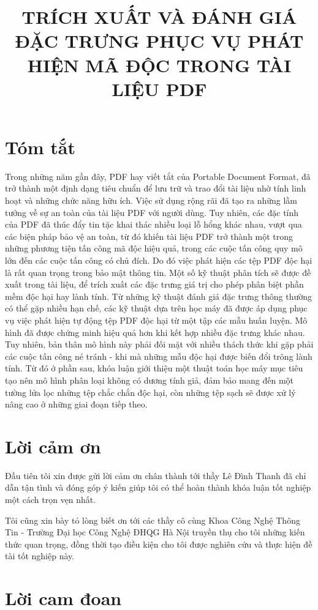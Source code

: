 \documentclass[12pt,a4paper]{report}
\title{TRÍCH XUẤT VÀ ĐÁNH GIÁ ĐẶC TRƯNG PHỤC VỤ PHÁT HIỆN MÃ ĐỘC TRONG TÀI LIỆU PDF}
\begin{document}

\clearpage{}

\chapter*{Tóm tắt}

Trong những năm gần đây, PDF hay viết tắt của Portable Document Format, đã trở thành một định dạng tiêu chuẩn để lưu trữ và trao đổi tài liệu nhờ tính linh hoạt và những chức năng hữu ích. Việc sử dụng rộng rãi đã tạo ra những lầm tưởng về sự an toàn của tài liệu PDF với người dùng. Tuy nhiên, các đặc tính của PDF đã thúc đẩy tin tặc khai thác nhiều loại lỗ hổng khác nhau, vượt qua các biện pháp bảo vệ an toàn, từ đó khiến tài liệu PDF trở thành một trong những phương tiện tấn công mã độc hiệu quả, trong các cuộc tấn công quy mô lớn đến các cuộc tấn công có chủ đích. Do đó việc phát hiện các tệp PDF độc hại là rất quan trọng trong bảo mật thông tin. Một số kỹ thuật phân tích sẽ được đề xuất trong tài liệu, để trích xuất các đặc trưng giá trị cho phép phân biệt phần mềm độc hại hay lành tính. Từ những kỹ thuật đánh giá đặc trưng thông thường có thể gặp nhiều hạn chế, các kỹ thuật dựa trên học máy đã được áp dụng phục vụ việc phát hiện tự động tệp PDF độc hại từ một tập các mẫu huấn luyện. Mô hình đã được chứng minh hiệu quả hơn khi kết hợp nhiều đặc trưng khác nhau. Tuy nhiên, bản thân mô hình này phải đối mặt với nhiều thách thức khi gặp phải các cuộc tấn công né tránh - khi mà những mẫu độc hại được biến đổi trông lành tính. Từ đó ở phần sau, khóa luận giới thiệu một thuật toán học máy mục tiêu tạo nên mô hình phân loại không có dương tính giả, đảm bảo mang đến một tường lửa lọc những tệp chắc chắn độc hại, còn những tệp sạch sẽ được xử lý nâng cao ở những giai đoạn tiếp theo.


\chapter*{Lời cảm ơn}


Đầu tiên tôi xin được gửi lời cảm ơn chân thành tới thầy Lê Đình Thanh đã chỉ dẫn tận tình và đóng góp ý kiến giúp tôi có thể hoàn thành khóa luận tốt nghiệp một cách trọn vẹn nhất.

Tôi cũng xin bày tỏ lòng biết ơn tới các thầy cô cùng Khoa Công Nghệ Thông Tin - Trường Đại học Công
Nghệ ĐHQG Hà Nội truyền thụ cho tôi những kiến thức quan trọng, đồng thời tạo điều kiện cho tôi được nghiên cứu và thực hiện đề tài tốt nghiệp này.

\chapter*{Lời cam đoan}
\end{document}
